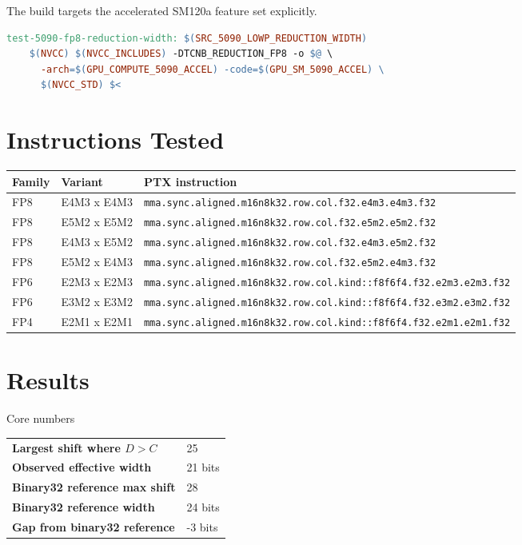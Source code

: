 \documentclass[11pt]{article}
\begin{document}
The build targets the accelerated SM120a feature set explicitly.

\begin{lstlisting}[language=make]
test-5090-fp8-reduction-width: $(SRC_5090_LOWP_REDUCTION_WIDTH)
	$(NVCC) $(NVCC_INCLUDES) -DTCNB_REDUCTION_FP8 -o $@ \
	  -arch=$(GPU_COMPUTE_5090_ACCEL) -code=$(GPU_SM_5090_ACCEL) \
	  $(NVCC_STD) $<
\end{lstlisting}

\section{Instructions Tested}

{\footnotesize
\begin{tabularx}{\linewidth}{l l Y}
\toprule
Family & Variant & PTX instruction \\
\midrule
FP8 & E4M3 x E4M3 & \texttt{mma.sync.aligned.m16n8k32.row.col.f32.e4m3.e4m3.f32} \\
FP8 & E5M2 x E5M2 & \texttt{mma.sync.aligned.m16n8k32.row.col.f32.e5m2.e5m2.f32} \\
FP8 & E4M3 x E5M2 & \texttt{mma.sync.aligned.m16n8k32.row.col.f32.e4m3.e5m2.f32} \\
FP8 & E5M2 x E4M3 & \texttt{mma.sync.aligned.m16n8k32.row.col.f32.e5m2.e4m3.f32} \\
FP6 & E2M3 x E2M3 & \texttt{mma.sync.aligned.m16n8k32.row.col.kind::f8f6f4.f32.e2m3.e2m3.f32} \\
FP6 & E3M2 x E3M2 & \texttt{mma.sync.aligned.m16n8k32.row.col.kind::f8f6f4.f32.e3m2.e3m2.f32} \\
FP4 & E2M1 x E2M1 & \texttt{mma.sync.aligned.m16n8k32.row.col.kind::f8f6f4.f32.e2m1.e2m1.f32} \\
\bottomrule
\end{tabularx}
}

\section{Results}

\begin{metricbox}{Core numbers}{}
\begin{tabularx}{\linewidth}{>{\bfseries}l Y}
\toprule
Largest shift where \(D>C\) & 25 \\
Observed effective width & 21 bits \\
Binary32 reference max shift & 28 \\
Binary32 reference width & 24 bits \\
Gap from binary32 reference & -3 bits \\
\bottomrule
\end{tabularx}
\end{metricbox}
\end{document}
